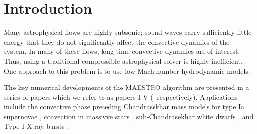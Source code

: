 \documentclass{aastex62}
\begin{document}


\section{Introduction} \label{sec:intro}

Many astrophysical flows are highly subsonic; sound waves carry sufficiently little energy that they do not significantly affect the convective dynamics of the system.
In many of these flows, long-time convective dynamics are of interest.
Thus, using a traditional compressible astrophysical solver is highly inefficient.
One approach to this problem is to use low Mach number hydrodynamic models.


The key numerical developments of the MAESTRO algorithm are presented in a series of papers which we refer to as papers I-V (\cite{MAESTRO_I,MAESTRO_II,MAESTRO_III,MAESTRO_IV,MAESTRO_V}, respectively).
Applications include the convective phase preceding Chandrasekhar mass models for type Ia supernovae \cite{MAESTRO_convection,MAESTRO_AMR,MAESTRO_CASTRO}, 
convection in massivve stars \cite{Gilet:2013},
sub-Chandrasekhar white dwarfs \cite{subChandra_I,subChandra_II}, and
Type I X-ray bursts \cite{XRB_I,XRB_II,XRB_III}.
\end{document}

